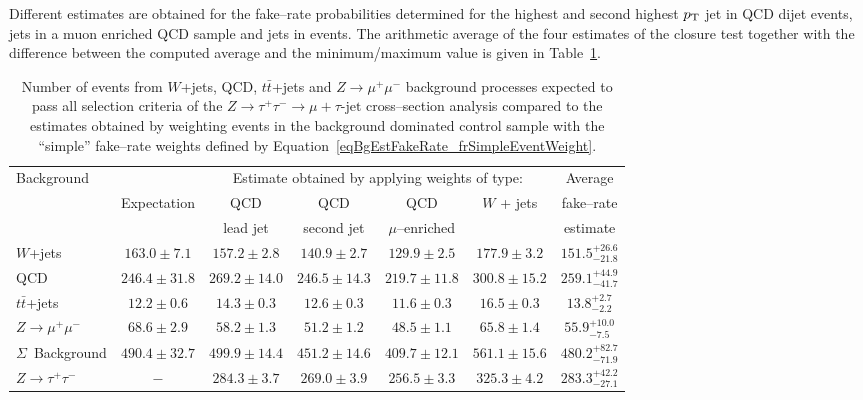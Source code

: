 Different estimates are obtained for the fake--rate probabilities determined for
the highest and second highest $p_{\mathrm{T}}$ jet in QCD dijet events, jets in a muon
enriched QCD sample and jets in \WpJets events.  The arithmetic average of the
four estimates of the closure test together with the difference between the
computed average and the minimum/maximum value is given in
Table~\ref{tabBgEstFakeRate_frSimpleResults}.
%
\begin{table}
\begin{center}
\begin{tabular}{|l|c|c|c|c|c|c|}
\hline
\multirow{2}{22mm}{Background}  &             & \multicolumn{4}{c|}{Estimate obtained by applying weights of type:} & Average \\
\multirow{2}{18mm}{Process}     & Expectation & QCD       & QCD        & QCD             & \multirow{2}{18mm}{$W$ + jets} & fake--rate \\
                                &             & lead jet & second jet & $\mu$--enriched &                                & estimate \\
\hline
\hline
$W$+jets                        & $163.0 \pm  7.1$ & $157.2 \pm  2.8$ & $140.9 \pm  2.7$ & $129.9 \pm  2.5$ & $177.9 \pm  3.2$ & $151.5^{+26.6}_{-21.8}$ \\
QCD                             & $246.4 \pm 31.8$ & $269.2 \pm 14.0$ & $246.5 \pm 14.3$ & $219.7 \pm 11.8$ & $300.8 \pm 15.2$ & $259.1^{+44.9}_{-41.7}$ \\
$t\bar{t}$+jets                 & $ 12.2 \pm  0.6$ & $ 14.3 \pm  0.3$ & $ 12.6 \pm  0.3$ & $ 11.6 \pm  0.3$ & $ 16.5 \pm  0.3$ & $ 13.8^{+2.7}_{-2.2}$ \\
$Z \rightarrow \mu^{+} \mu^{-}$ & $ 68.6 \pm  2.9$ & $ 58.2 \pm  1.3$ & $ 51.2 \pm  1.2$ & $ 48.5 \pm  1.1$ & $ 65.8 \pm  1.4$ & $ 55.9^{+10.0}_{-7.5}$ \\
\hline
$\Sigma$~Background             & $490.4 \pm 32.7$ & $499.9 \pm 14.4$ & $451.2 \pm 14.6$ & $409.7 \pm 12.1$ & $561.1 \pm 15.6$ & $480.2^{+82.7}_{-71.9}$ \\     
\hline
\hline
$Z \rightarrow \tau^{+} \tau^{-}$ & $-$ & $284.3 \pm 3.7$ & $269.0 \pm 3.9$ & $256.5 \pm 3.3$ & $325.3 \pm 4.2$ & $283.3^{+42.2}_{-27.1}$ \\
\hline
\end{tabular}
\end{center}
\begin{center}
\caption[Fake--rate ``simple'' method closure test results]{\captiontext Number
of events from $W$+jets, QCD, $t\bar{t}$+jets and $Z \rightarrow \mu^{+}
\mu^{-}$ background processes expected to pass all selection criteria of the $Z
\rightarrow \tau^{+} \tau^{-} \rightarrow \mu + \tau\mbox{-jet}$ cross--section
analysis compared to the estimates obtained by weighting events in the
background dominated control sample with the ``simple'' fake--rate weights
defined by Equation~\ref{eqBgEstFakeRate_frSimpleEventWeight}.}
\label{tabBgEstFakeRate_frSimpleResults}
\end{center}
\end{table}

